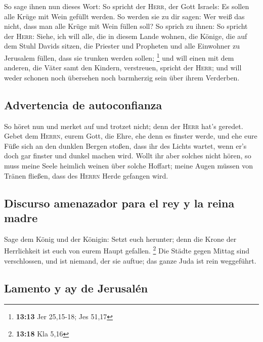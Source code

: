  So sage ihnen nun dieses Wort: So spricht der
\textsc{Herr}, der Gott Israels: Es sollen alle Krüge mit Wein gefüllt
werden. So werden sie zu dir sagen: Wer weiß das nicht, dass man alle
Krüge mit Wein füllen soll?  So sprich zu ihnen: So
spricht der \textsc{Herr}: Siehe, ich will alle, die in diesem Lande
wohnen, die Könige, die auf dem Stuhl Davids sitzen, die Priester und
Propheten und alle Einwohner zu Jerusalem füllen, dass sie trunken
werden sollen; \footnote{\textbf{13:13} Jer 25,15-18; Jes 51,17}
 und will einen mit dem anderen, die Väter samt den
Kindern, verstreuen, spricht der \textsc{Herr}; und will weder schonen
noch übersehen noch barmherzig sein über ihrem Verderben.

\hypertarget{advertencia-de-autoconfianza}{%
\subsection{Advertencia de
autoconfianza}\label{advertencia-de-autoconfianza}}

 So höret nun und merket auf und trotzet nicht; denn der
\textsc{Herr} hat's geredet.  Gebet dem \textsc{Herrn},
eurem Gott, die Ehre, ehe denn es finster werde, und ehe eure Füße sich
an den dunklen Bergen stoßen, dass ihr des Lichts wartet, wenn er's doch
gar finster und dunkel machen wird.  Wollt ihr aber
solches nicht hören, so muss meine Seele heimlich weinen über solche
Hoffart; meine Augen müssen von Tränen fließen, dass des \textsc{Herrn}
Herde gefangen wird.

\hypertarget{discurso-amenazador-para-el-rey-y-la-reina-madre}{%
\subsection{Discurso amenazador para el rey y la reina
madre}\label{discurso-amenazador-para-el-rey-y-la-reina-madre}}

 Sage dem König und der Königin: Setzt euch herunter;
denn die Krone der Herrlichkeit ist euch von eurem Haupt gefallen.
\footnote{\textbf{13:18} Kla 5,16}  Die Städte gegen
Mittag sind verschlossen, und ist niemand, der sie auftue; das ganze
Juda ist rein weggeführt.

\hypertarget{lamento-y-ay-de-jerusaluxe9n}{%
\subsection{Lamento y ay de
Jerusalén}\label{lamento-y-ay-de-jerusaluxe9n}}

